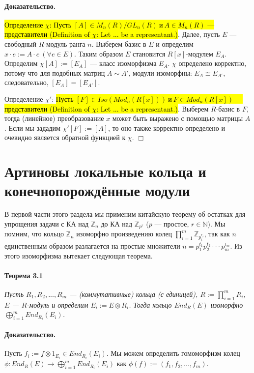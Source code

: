 \documentclass[a4paper,12pt]{article}
\begin{document}
\paragraph{Доказательство.}
\hl{Определение $\chi$: Пусть $[A] \in M_n(R)/GL_n(R) ~ и ~ A \in M_n(R)$ --- представители (Definition of $\chi$: Let ... be a representant.)}.
Далее, пусть $E$ --- свободный $R$-модуль ранга $n$. Выберем базис в $E$ и определим $x \cdot e := A \cdot e ~ (\forall e \in E)$. Таким образом $E$ становится $R[x]$-модулем $E_A$. Определим $\chi [A] := [E_A]$ --- класс изоморфизма $E_A$. $\chi$ определено корректно, потому что для подобных матриц $A \sim A'$, модули изоморфны: $E_A \cong E_{A'}$, следовательно, $[E_A] = [E_{A'}]$.

Определение $\chi'$: \hl{Пусть $[F] \in Iso(Mod_n(R[x])) ~ и ~ F \in Mod_n(R[x])$ --- представители (Definition of $\chi$: Let ... be a representant.)}. Выберем $R$-базис в $F$, тогда (линейное) преобразование $x$ может быть выражено с помощью матрицы $A$. Если мы зададим $\chi'[F] := [A]$, то оно также корректно определено и очевидно является обратной функцией к $\chi$.  $\Box$

\section{Артиновы локальные кольца и конечнопорождённые модули}

В первой части этого раздела мы применим китайскую теорему об остатках для упрощения задачи с КА над $\mathbb{Z}_{n}$ до КА над $\mathbb{Z}_{p^r}$ ($p$ --- простое, $r \in \mathbb{N}$).
Мы помним, что кольцо $\mathbb{Z}_{n}$ изоморфно произведению колец $\prod_{i=1}^{m} { {\mathbb{Z}}_{{p_{i}^{r_{i}}}}}$, так как $n$ единственным образом разлагается на простые множители $n = p_1^{t_1} p_2^{t_2} \cdot \cdot \cdot p_m^{t_m}$. Из этого изоморфизма вытекает следующая теорема. 

\paragraph{Теорема 3.1}{\itshape
Пусть $R_1, R_2, ..., R_m$ --- (коммутативные) кольца (с единицей), $R:=\prod_{i=1}^{m}R_i$, $E$ --- $R$-модуль и определим $E_i := E \otimes R_i$. Тогда кольцо $End_R(E)$ изоморфно $\bigoplus_{i=1}^{m}End_{R_i}(E_i)$.
}
\paragraph{Доказательство.}
Пусть $f_i := f\otimes1_{E_i} \in End_{R_i}(E_i)$. Мы можем определить гомоморфизм колец $\phi : End_R(E) \rightarrow \bigoplus_{i=1}^{m} End_{R_i} (E_i)$ как $\phi(f) := (f_1, f_2, ..., f_m)$. 
\end{document}

